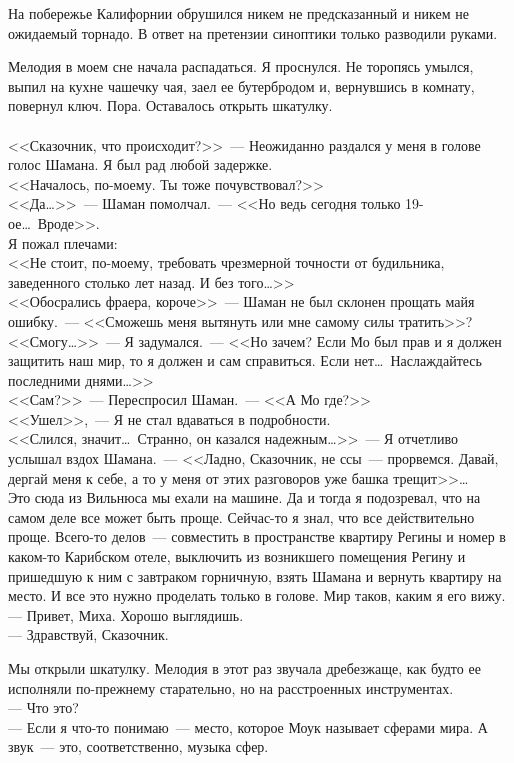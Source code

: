 На побережье Калифорнии обрушился никем не предсказанный и никем не ожидаемый 
торнадо. В ответ на претензии синоптики только разводили руками.

Мелодия в моем сне начала распадаться. Я проснулся. Не торопясь умылся, выпил 
на кухне чашечку чая, заел ее бутербродом и, вернувшись в комнату, повернул ключ. 
Пора. Оставалось открыть шкатулку.\\
\\
<<Сказочник, что происходит?>>~--- Неожиданно раздался у меня в голове голос 
Шамана. Я был рад любой задержке.\\
<<Началось, по-моему. Ты тоже почувствовал?>>\\
<<Да\ldots>>~--- Шаман помолчал.~--- <<Но ведь сегодня только 
19-ое\ldots\ Вроде>>.\\
Я пожал плечами:\\
<<Не стоит, по-моему, требовать чрезмерной точности от будильника, заведенного 
столько лет назад. И без того\ldots>>\\
<<Обосрались фраера, короче>>~--- Шаман не был склонен прощать майя ошибку.~--- 
<<Сможешь меня вытянуть или мне самому силы тратить>>?\\
<<Смогу\ldots>>~--- Я задумался.~--- <<Но зачем? Если Мо был прав и я должен 
защитить наш мир, то я должен и сам справиться. Если нет\ldots\ Наслаждайтесь последними 
днями\ldots>>\\
<<Сам?>>~--- Переспросил Шаман.~--- <<А Мо где?>>\\
<<Ушел>>,~--- Я не стал вдаваться в подробности.\\
<<Слился, значит\ldots\ Странно, он казался надежным\ldots >>~--- Я отчетливо 
услышал вздох Шамана.~--- <<Ладно, Сказочник, не ссы~--- прорвемся. Давай, дергай меня к 
себе, а то у меня от этих разговоров уже башка трещит>>\ldots\\

Это сюда из Вильнюса мы ехали на машине. Да и тогда я подозревал, что на самом 
деле все может быть проще. Сейчас-то я знал, что все действительно проще. 
Всего-то делов~--- совместить в пространстве квартиру Регины и номер в каком-то 
Карибском отеле, выключить из возникшего помещения Регину и пришедшую к ним с 
завтраком горничную, взять Шамана и вернуть квартиру на место. И все это нужно 
проделать только в голове. Мир таков, каким я его вижу. \\
--- Привет, Миха. Хорошо выглядишь.\\
--- Здравствуй, Сказочник.

Мы открыли шкатулку. Мелодия в этот раз звучала дребезжаще, как будто ее 
исполняли по-прежнему старательно, но на расстроенных инструментах.\\
--- Что это?\\
--- Если я что-то понимаю~--- место, которое Моук называет сферами мира. А 
звук~--- это, соответственно, музыка сфер.


